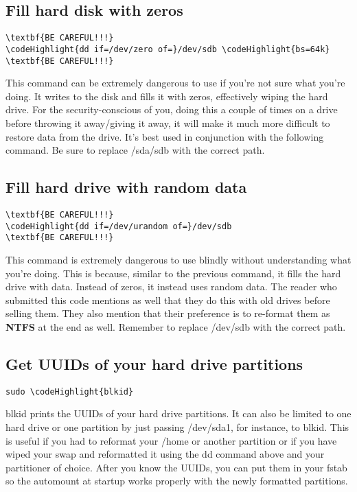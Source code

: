 \documentclass[12pt,a4paper]{article}
\begin{document}
\subsection{Fill hard disk with zeros}
\begin{Verbatim}[commandchars=\\\{\}]
\textbf{BE CAREFUL!!!}
\codeHighlight{dd if=/dev/zero of=}/dev/sdb \codeHighlight{bs=64k}
\textbf{BE CAREFUL!!!}
\end{Verbatim}
This command can be extremely dangerous to use if you're not sure what you're doing. It writes to the disk and fills it with zeros, effectively wiping the hard drive.  For the security-conscious of you, doing this a couple of times on a drive before throwing it away/giving it away, it will make it much more difficult to restore data from the drive. It's best used in conjunction with the following command. Be sure to replace /sda/sdb with the correct path.

\subsection{Fill hard drive with random data}
\begin{Verbatim}[commandchars=\\\{\}]
\textbf{BE CAREFUL!!!}
\codeHighlight{dd if=/dev/urandom of=}/dev/sdb
\textbf{BE CAREFUL!!!}
\end{Verbatim}
This command is extremely dangerous to use blindly without understanding what you're doing. This is because, similar to the previous command, it fills the hard drive with data. Instead of zeros, it instead uses random data. The reader who submitted this code mentions as well that they do this with old drives before selling them. They also mention that their preference is to re-format them as \textbf{NTFS} at the end as well.  Remember to replace /dev/sdb with the correct path.

\subsection{Get UUIDs of your hard drive partitions}
\begin{Verbatim}[commandchars=\\\{\}]
sudo \codeHighlight{blkid}
\end{Verbatim}
blkid prints the UUIDs of your hard drive partitions. It can also be limited to one hard drive or one partition by just passing /dev/sda1, for instance, to blkid. This is useful if you had to reformat your /home or another partition or if you have wiped your swap and reformatted it using the dd command above and your partitioner of choice. After you know the UUIDs, you can put them in your fstab so the automount at startup works properly with the newly formatted partitions.
\end{document}
